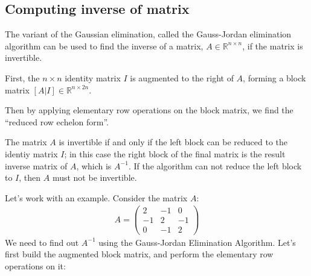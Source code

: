 \documentclass[conference,final,11pt,technote,onecolumn]{IEEEtran}\usepackage[]{graphicx}\usepackage[]{color}
\begin{document}
\subsection{Computing inverse of matrix}
\label{term:term:gauss_jordan_elimination_algorithm_compute_inverse}
The variant of the Gaussian elimination, called the Gauss-Jordan elimination algorithm can be used to find the inverse of a matrix, $A\in \mathbb{R}^{n\times n}$, if the matrix is invertible. 

First, the $n\times n$ identity matrix $I$ is augmented to the right of $A$, forming a block matrix $[A | I] \in \mathbb{R}^{n\times 2n}$.

Then by applying elementary row operations on the block matrix, we find the ``reduced row echelon form''.

The matrix $A$ is invertible if and only if the left block can be reduced to the identiy matrix $I$; in this case the right block of the final matrix is the result inverse matrix of $A$, which is $A^{-1}$. If the algorithm can not reduce the left block to $I$, then $A$ must not be invertible.

Let's work with an example. Consider the matrix $A$:
\begin{eqnarray}
\nonumber A = \begin{pmatrix}
2 & -1 & 0\\
-1 & 2 & -1\\
0 & -1 & 2
\end{pmatrix}
\end{eqnarray}
We need to find out $A^{-1}$ using the Gauss-Jordan Elimination Algorithm. Let's first build the augmented block matrix, and perform the elementary row operations on it:
\end{document}
